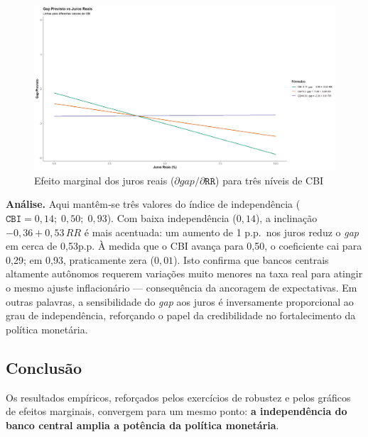 \documentclass[a4paper,12pt]{article}[abnt2]
\begin{document}
\begin{figure}[H]
    \centering
    \caption{Efeito marginal dos juros reais (\(\partial\textit{gap}/\partial\texttt{RR}\)) para três níveis de CBI}
    \label{fig:marg_rr}
    \includegraphics[width=.85\linewidth]{Imagens/ai1i2.png}
\end{figure}

\begin{flushleft}\small
\textbf{Análise.}  Aqui mantêm‑se três valores do índice de independência  
(\(\texttt{CBI}=0{,}14;\;0{,}50;\;0{,}93\)).  
Com baixa independência (\(0{,}14\)), a inclinação \(-0{,}36+0{,}53\,RR\) é mais acentuada: um aumento de 1 p.p.\ nos juros reduz o \textit{gap} em cerca de 0,53p.p.  
À medida que o CBI avança para 0,50, o coeficiente cai para 0,29; em 0,93, praticamente zera (\(0{,}01\)).  
Isto confirma que bancos centrais altamente autônomos requerem variações muito menores na taxa real para atingir o mesmo ajuste inflacionário — consequência da ancoragem de expectativas.  
Em outras palavras, a sensibilidade do \textit{gap} aos juros é inversamente proporcional ao grau de independência, reforçando o papel da credibilidade no fortalecimento da política monetária.
\end{flushleft}

\subsection{\textbf{Conclusão}}
Os resultados empíricos, reforçados pelos exercícios de robustez e pelos
gráficos de efeitos marginais, convergem para um mesmo ponto: \textbf{a
independência do banco central amplia a potência da política monetária}.  
\end{document}
